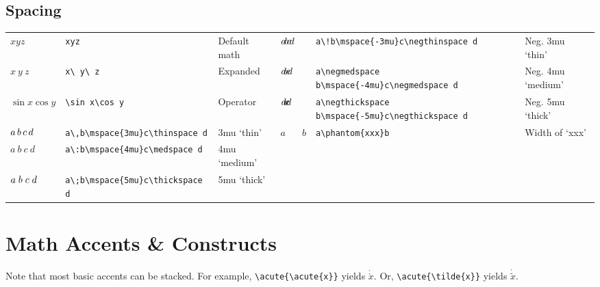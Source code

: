 \documentclass[10pt, english]{article}
\begin{document}
	\subsection{Spacing}

	\begin{center}
		\scriptsize
	\begin{tabular}{lll|lll}
		$xyz$ & \verb|xyz| & Default math & $a\!b\mspace{-3mu}c\negthinspace d$ & \verb|a\!b\mspace{-3mu}c\negthinspace d| & Neg. 3mu `thin' \\
		$x\ y\ z$ & \verb|x\ y\ z| & Expanded & $a\negmedspace b\mspace{-4mu}c\negmedspace d$ & \verb|a\negmedspace b\mspace{-4mu}c\negmedspace d| & Neg. 4mu `medium' \\
		$\sin x\cos y$ & \verb|\sin x\cos y| & Operator & $a\negthickspace b\mspace{-5mu}c\negthickspace d$ & \verb|a\negthickspace b\mspace{-5mu}c\negthickspace d| & Neg. 5mu `thick' \\
		$a\,b\mspace{3mu}c\thinspace d$ & \verb|a\,b\mspace{3mu}c\thinspace d| & 3mu `thin' & $a\phantom{xxx}b$ & \verb|a\phantom{xxx}b| & Width of `xxx' \\
		$a\:b\mspace{4mu}c\medspace d$ & \verb|a\:b\mspace{4mu}c\medspace d| & 4mu `medium' \\
		$a\;b\mspace{5mu}c\thickspace d$ & \verb|a\;b\mspace{5mu}c\thickspace d| & 5mu `thick' \\
	\end{tabular}
	\end{center}

\newpage

\section{Math Accents \& Constructs}

	Note that most basic accents can be stacked. For example, \verb|\acute{\acute{x}}| yields $\acute{\acute{x}}$. Or, \verb|\acute{\tilde{x}}| yields $\acute{\tilde{x}}$.
\end{document}
